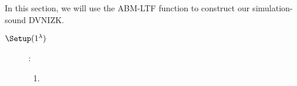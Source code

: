 In this section, we will use the ABM-LTF function to construct our simulation-sound DVNIZK.
\begin{description}
\item[$\Setup(1^\lambda)$]:
  \begin{enumerate}
  \item 
  \end{enumerate}
\end{description}

